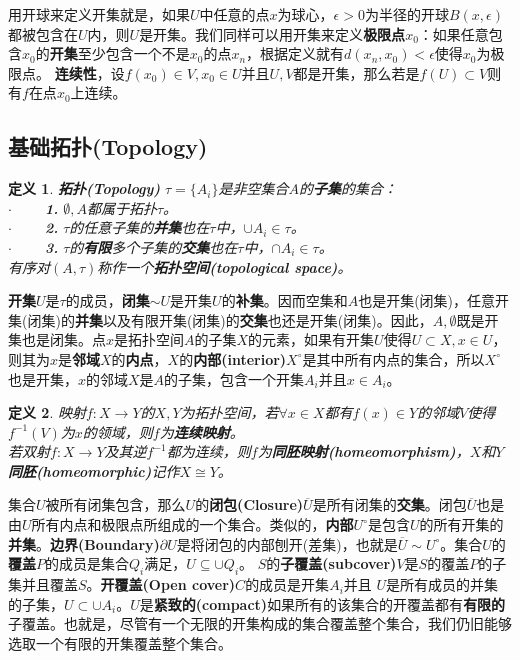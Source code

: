 \documentclass[mathserif,hyperref,UTF8,openany,b5paper]{ctexbook}
\newtheorem{defn}{定义}[section]
\begin{document}
用开球来定义开集就是，如果$U$中任意的点$x$为球心，$\epsilon > 0$为半径的开球$B(x,\epsilon)$都被包含在$U$内，则$U$是开集。我们同样可以用开集来定义\textbf{极限点}$x_0$：如果任意包含$x_0$的\textbf{开集}至少包含一个不是$x_0$的点$x_n$，根据定义就有$d(x_n,x_0)<\epsilon$使得$x_0$为极限点。
\textbf{连续性}，设$f(x_0)\in V, x_0\in U$并且$U,V$都是开集，那么若是$f(U) \subset V$则有$f$在点$x_0$上连续。
\subsection{基础拓扑(Topology)}
\begin{defn}
\textbf{拓扑(Topology)} $\tau = \{A_i\}$是非空集合$A$的\textbf{子集}的集合：\\
$\cdot \qquad$ \textbf{1.} $\emptyset, A $都属于拓扑$\tau$。\\
$\cdot \qquad$ \textbf{2.} $\tau$的任意子集的\textbf{并集}也在$\tau$中，$\cup A_i \in \tau$。\\
$\cdot \qquad$ \textbf{3.} $\tau$的\textbf{有限}多个子集的\textbf{交集}也在$\tau$中，$\cap A_i \in \tau$。\\	
有序对$(A,\tau)$称作一个\textbf{拓扑空间(topological space)}。
\end{defn}
\textbf{开集}$U$是$\tau$的成员，\textbf{闭集}$\sim U$是开集$U$的\textbf{补集}。因而空集和$A$也是开集(闭集)，任意开集(闭集)的\textbf{并集}以及有限开集(闭集)的\textbf{交集}也还是开集(闭集)。因此，$A,\emptyset$既是开集也是闭集。点$x$是拓扑空间$A$的子集$X$的元素，如果有开集$U$使得$U\subset X,x\in U$，则其为$x$是\textbf{邻域}$X$的\textbf{内点}，$X$的\textbf{内部(interior)}$X^\circ$是其中所有内点的集合，所以$X^\circ$也是开集，$x$的邻域$X$是$A$的子集，包含一个开集$A_i$并且$x \in A_i$。
\begin{defn}
映射$f:X\xrightarrow{}Y$的$X,Y$为拓扑空间，若$\forall x\in X$都有$f(x)\in Y$的邻域$V$使得$f^{-1}(V)$为$x$的领域，则$f$为\textbf{连续映射}。\\
若双射$f:X\xrightarrow{}Y$及其逆$f^{-1}$都为连续，则$f$为\textbf{同胚映射(homeomorphism)}，$X$和$Y$\textbf{同胚(homeomorphic)}记作$X\cong Y$。
\end{defn}
集合$U$被所有闭集包含，那么$U$的\textbf{闭包(Closure)}$\overline{U}$是所有闭集的\textbf{交集}。闭包$\overline{U}$也是由$U$所有内点和极限点所组成的一个集合。类似的，\textbf{内部}$U^\circ$是包含$U$的所有开集的\textbf{并集}。\textbf{边界(Boundary)}$\partial U$是将闭包的内部刨开(差集)，也就是$\overline{U} \sim U^\circ$。集合$U$的\textbf{覆盖}$P$的成员是集合$Q_i$满足，$U \subseteq \cup Q_i$。
$S$的\textbf{子覆盖(subcover)}$V$是$S$的覆盖$P$的子集并且覆盖$S$。\textbf{开覆盖(Open cover)}$C$的成员是开集$A_i$并且
$U$是所有成员的并集的子集，$U \subset \cup A_i$。$U$是\textbf{紧致的(compact)}如果所有的该集合的开覆盖都有\textbf{有限的}子覆盖。也就是，尽管有一个无限的开集构成的集合覆盖整个集合，我们仍旧能够选取一个有限的开集覆盖整个集合。
\end{document}
